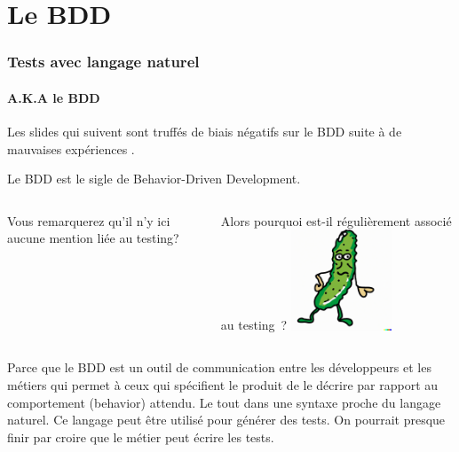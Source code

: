 \documentclass{beamer}
\begin{document}
    \section{Le BDD}\label{sec:le-bdd}
    \begin{frame}
        \frametitle{Tests avec langage naturel}
        \framesubtitle{A.K.A le BDD}
        \transdissolve

        \begin{dangercolorbox}
            Les slides qui suivent sont truffés de biais négatifs sur le BDD suite à de mauvaises expériences .

        \end{dangercolorbox}
        Le BDD est le sigle de Behavior-Driven Development.
        \begin{columns}
            Vous remarquerez qu'il n'y ici aucune mention liée au testing?

            Alors pourquoi est-il régulièrement associé au testing~?
            \centering
            \includegraphics[width=3cm]{image/funny-drawing-of-a-cucumber}
        \end{columns}
        Parce que le BDD est un outil de communication entre les développeurs et les métiers qui permet à ceux qui spécifient le produit de le décrire par rapport au comportement (behavior) attendu.
        Le tout dans une syntaxe proche du langage naturel.
        Ce langage peut être utilisé pour générer des tests.
        On pourrait presque finir par croire que le métier peut écrire les tests.
    \end{frame}
\end{document}
